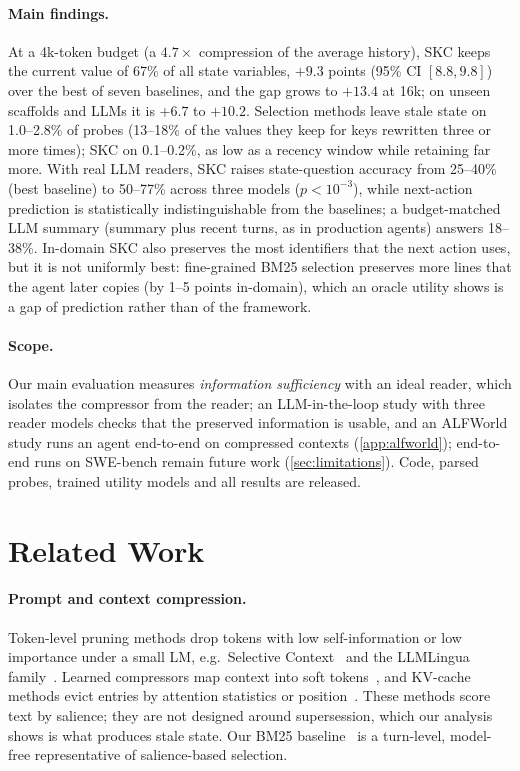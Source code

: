 \paragraph{Main findings.} At a 4k-token budget (a $4.7\times$ compression of
the average history), SKC keeps the current value of 67\% of all state
variables, $+9.3$ points (95\% CI $[8.8,9.8]$) over the best of seven baselines,
and the gap grows to $+13.4$ at 16k; on unseen scaffolds and LLMs it is $+6.7$
to $+10.2$. Selection methods leave stale state on 1.0--2.8\% of probes (13--18\% of
the values they keep for keys rewritten three or more times); SKC on 0.1--0.2\%, as low as
a recency window while retaining far more. With real LLM readers, SKC raises
state-question accuracy from 25--40\% (best baseline) to 50--77\% across three
models ($p<10^{-3}$), while next-action prediction is statistically
indistinguishable from the baselines; a budget-matched LLM summary (summary plus
recent turns, as in production agents) answers 18--38\%. In-domain SKC also
preserves the most identifiers that the next action uses, but it is not
uniformly best: fine-grained BM25 selection preserves more lines that the agent
later copies (by 1--5 points in-domain), which an oracle utility shows is a gap
of prediction rather than of the framework.

\paragraph{Scope.} Our main evaluation measures \emph{information sufficiency}
with an ideal reader, which isolates the compressor from the reader; an
LLM-in-the-loop study with three reader models checks that the preserved
information is usable, and an ALFWorld study runs an agent end-to-end on
compressed contexts (\cref{app:alfworld}); end-to-end runs on SWE-bench remain
future work (\cref{sec:limitations}). Code, parsed probes, trained utility models and all
results are released.

\section{Related Work}
\label{sec:related}

\paragraph{Prompt and context compression.} Token-level pruning methods drop
tokens with low self-information or low importance under a small LM, e.g.\
Selective Context~\citep{li2023selective} and the LLMLingua
family~\citep{jiang2023llmlingua,jiang2024longllmlingua,pan2024llmlingua2}.
Learned compressors map context into soft tokens~\citep{mu2023gist,chevalier2023autocompressors,ge2024icae},
and KV-cache methods evict entries by attention statistics or position~\citep{zhang2023h2o,xiao2024streamingllm}.
These methods score text by salience; they are not designed around
supersession, which our analysis shows is what produces stale state. Our BM25
baseline~\citep{robertson2009bm25} is a turn-level, model-free representative of
salience-based selection.

